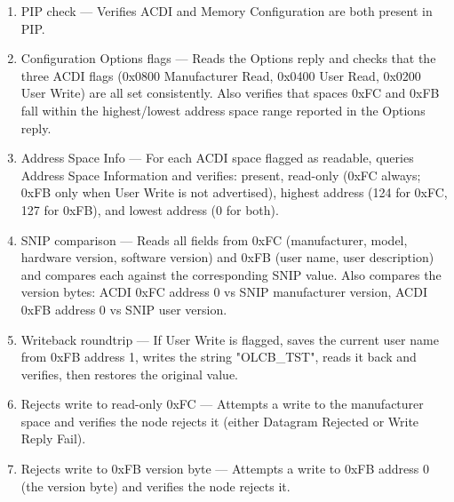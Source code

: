 \begin{enumerate}

\item PIP check — Verifies ACDI and Memory Configuration are both present in PIP.

\item Configuration Options flags — Reads the Options reply and checks that the
three ACDI flags (0x0800 Manufacturer Read, 0x0400 User Read, 0x0200 User Write)
are all set consistently.  Also verifies that spaces 0xFC and 0xFB fall within
the highest/lowest address space range reported in the Options reply.

\item Address Space Info — For each ACDI space flagged as readable, queries Address
Space Information and verifies: present, read-only (0xFC always; 0xFB only when
User Write is not advertised), highest address (124 for 0xFC, 127 for 0xFB), and
lowest address (0 for both).

\item SNIP comparison — Reads all fields from 0xFC (manufacturer, model, hardware version,
software version) and 0xFB (user name, user description) and compares each against the
corresponding SNIP value.  Also compares the version bytes: ACDI 0xFC address 0
vs SNIP manufacturer version, ACDI 0xFB address 0 vs SNIP user version.

\item Writeback roundtrip — If User Write is flagged, saves the current user name
from 0xFB address 1, writes the string "OLCB\_TST", reads it back and
verifies, then restores the original value.

\item Rejects write to read-only 0xFC — Attempts a write to the manufacturer
space and verifies the node rejects it (either Datagram Rejected or Write Reply
Fail).

\item Rejects write to 0xFB version byte — Attempts a write to 0xFB address 0
(the version byte) and verifies the node rejects it.

\end{enumerate}




  
